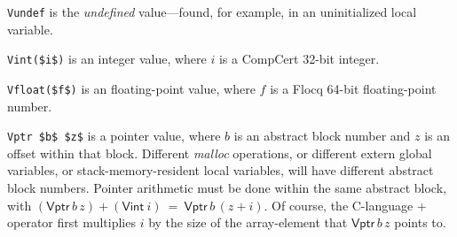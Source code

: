 \documentclass[12pt,fleqn,openany,oneside,showtrims]{memoir}
\begin{document}
\lstinline{Vundef} is the \emph{undefined} value---found, for example,
in an uninitialized local variable.

\lstinline{Vint($i$)} is an integer value,
where $i$ is a CompCert 32-bit integer.

\lstinline{Vfloat($f$)} is an floating-point value,
where $f$ is a Flocq 64-bit floating-point number.

\lstinline{Vptr $b$ $z$} is a pointer value,
where $b$ is an abstract block number and $z$ is an offset
within that block.  Different \emph{malloc} operations,
or different extern global variables, or 
stack-memory-resident local variables,
will have different abstract block numbers.
Pointer arithmetic must be done within the same abstract block,
with $(\mathsf{Vptr}\,b\,z)+(\mathsf{Vint}~i)~=~\mathsf{Vptr}\,b\,(z+i)$.
Of course, the C-language + operator first multiplies $i$
by the size of the array-element that 
$\mathsf{Vptr}\,b\,z$ points to.
\end{document}
